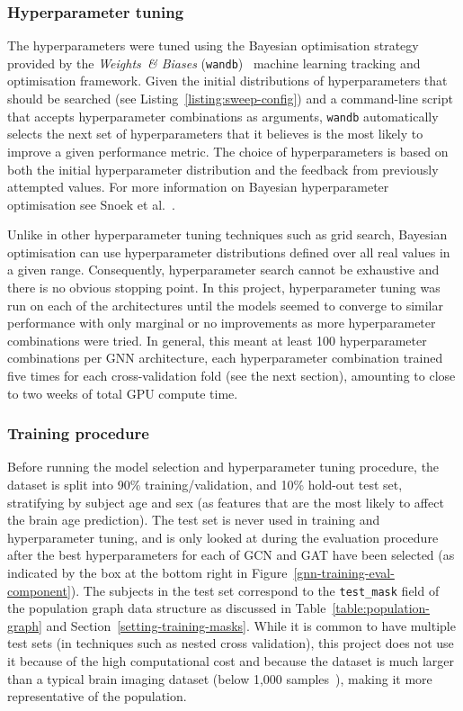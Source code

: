 \subsubsection{Hyperparameter tuning}
The hyperparameters were tuned using the Bayesian optimisation strategy provided by the \textit{Weights~\& Biases} (\texttt{wandb})~\cite{wandb} machine learning tracking and optimisation framework. Given the initial distributions of hyperparameters that should be searched (see Listing~\ref{listing:sweep-config}) and a command-line script that accepts hyperparameter combinations as arguments, \texttt{wandb} automatically selects the next set of hyperparameters that it believes is the most likely to improve a given performance metric. The choice of hyperparameters is based on both the initial hyperparameter distribution and the feedback from previously attempted values. For more information on Bayesian hyperparameter optimisation see Snoek et al.~\cite{snoek2012practical}.

Unlike in other hyperparameter tuning techniques such as grid search, Bayesian optimisation can use hyperparameter distributions defined over all real values in a given range. Consequently, hyperparameter search cannot be exhaustive and there is no obvious stopping point. In this project, hyperparameter tuning was run on each of the architectures until the models seemed to converge to similar performance with only marginal or no improvements as more hyperparameter combinations were tried. In general, this meant at least 100 hyperparameter combinations per GNN architecture, each hyperparameter combination trained five times for each cross-validation fold (see the next section), amounting to close to two weeks of total GPU compute time.

\subsubsection{Training procedure}
\label{section:training-procedure}

Before running the model selection and hyperparameter tuning procedure, the dataset is split into 90\% training/validation, and 10\% hold-out test set, stratifying by subject age and sex (as features that are the most likely to affect the brain age prediction). The test set is never used in training and hyperparameter tuning, and is only looked at during the evaluation procedure after the best hyperparameters for each of GCN and GAT have been selected (as indicated by the box at the bottom right in Figure~\ref{gnn-training-eval-component}). The subjects in the test set correspond to the \texttt{test\_mask} field of the population graph data structure as discussed in Table~\ref{table:population-graph} and Section~\ref{setting-training-masks}. While it is common to have multiple test sets (in techniques such as nested cross validation), this project does not use it because of the high computational cost and because the dataset is much larger than a typical brain imaging dataset (below 1,000 samples~\cite{parisot2018disease, cole2018brain}), making it more representative of the population.

